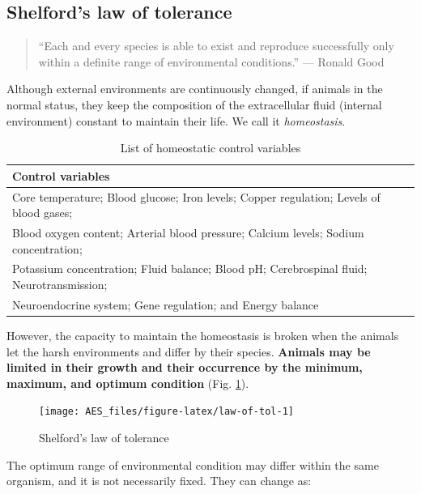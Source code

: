 \documentclass[]{book}
\begin{document}
\subsection{Shelford's law of
tolerance}\label{shelfords-law-of-tolerance}

\begin{quote}
``Each and every species is able to exist and reproduce successfully
only within a definite range of environmental conditions.'' --- Ronald
Good
\end{quote}

Although external environments are continuously changed, if animals in
the normal status, they keep the composition of the extracellular fluid
(internal environment) constant to maintain their life. We call it
\emph{homeostasis}.

\begin{table}

\caption{\label{tab:homeostasis}List of homeostatic control variables}
\centering
\begin{tabular}[t]{l}
\toprule
Control variables\\
\midrule
Core temperature; Blood glucose; Iron levels; Copper regulation; Levels of blood gases;\\
Blood oxygen content; Arterial blood pressure; Calcium levels; Sodium concentration;\\
Potassium concentration; Fluid balance; Blood pH; Cerebrospinal fluid; Neurotransmission;\\
Neuroendocrine system; Gene regulation; and Energy balance\\
\bottomrule
\end{tabular}
\end{table}

However, the capacity to maintain the homeostasis is broken when the
animals let the harsh environments and differ by their species.
\textbf{Animals may be limited in their growth and their occurrence by
the minimum, maximum, and optimum condition} \citep{shelford} (Fig.
\ref{fig:law-of-tol}).

\begin{figure}

{\centering \texttt{[image: AES\_files/figure-latex/law-of-tol-1]} 

}

\caption{Shelford's law of tolerance}\label{fig:law-of-tol}
\end{figure}

The optimum range of environmental condition may differ within the same
organism, and it is not necessarily fixed. They can change as:
\end{document}
